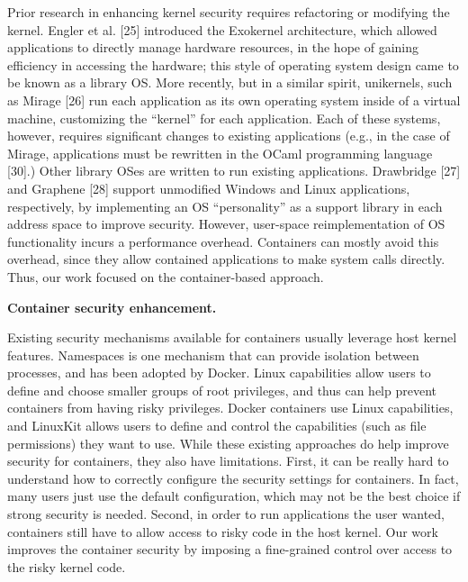 Prior research in enhancing kernel security requires refactoring or modifying the kernel. 
Engler et al. [25] introduced the Exokernel architecture, which allowed applications to directly manage hardware resources, in the hope of gaining efficiency in accessing the hardware; 
this style of operating system design came to be known as a library OS. More recently, but in a similar spirit, unikernels, such as Mirage [26] run each application as its own operating system 
inside of a virtual machine, customizing the “kernel” for each application. Each of these systems, however, requires significant changes to existing applications 
(e.g., in the case of Mirage, applications must be rewritten in the OCaml programming language [30].) Other library OSes are written to run existing applications. Drawbridge [27] and Graphene [28] 
support unmodified Windows and Linux applications, respectively, by implementing an OS “personality” as a support library in each address space to improve security. 
However, user-space reimplementation of OS functionality incurs a performance overhead. Containers can mostly avoid this overhead, 
since they allow contained applications to make system calls directly. Thus, our work focused on the container-based approach. 

\textbf{Container security enhancement.} 

Existing security mechanisms available for containers usually leverage host kernel features. Namespaces is one mechanism that can provide isolation 
between processes, and has been adopted by Docker. Linux capabilities allow users to define and choose smaller groups of root privileges, and thus can help prevent containers from having risky 
privileges. Docker containers use Linux capabilities, and LinuxKit allows users to define and control the capabilities (such as file permissions) they want to use. While these existing approaches do 
help improve security for containers, they also have limitations. First, it can be really hard to understand how to correctly configure the security settings for containers. 
In fact, many users just use the default configuration, which may not be the best choice if strong security is needed. Second, in order to run applications the user wanted, 
containers still have to allow access to risky code in the host kernel. Our work improves the container security by imposing a fine-grained control over access to the risky kernel code.  
